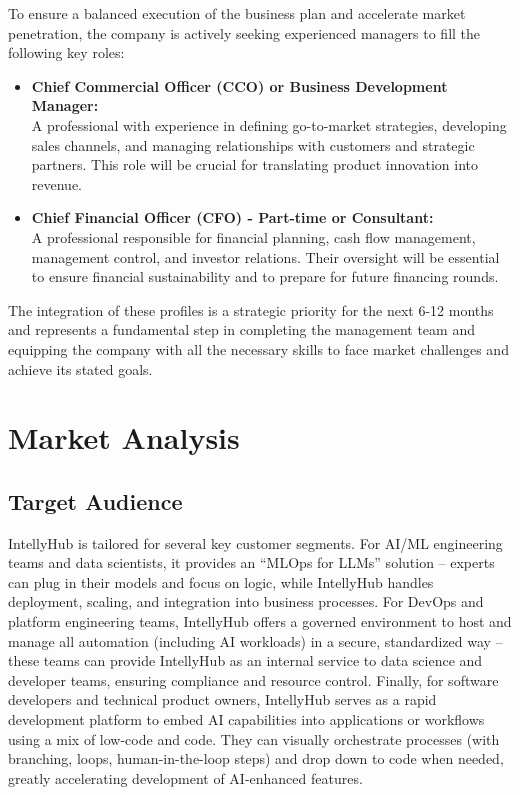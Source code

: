 To ensure a balanced execution of the business plan and accelerate market penetration, the company is actively seeking experienced managers to fill the following key roles:

\begin{itemize}
    \item \textbf{Chief Commercial Officer (CCO) or Business Development Manager:} \\
    A professional with experience in defining go-to-market strategies, developing sales channels, and managing relationships with customers and strategic partners. This role will be crucial for translating product innovation into revenue.

    \item \textbf{Chief Financial Officer (CFO) - Part-time or Consultant:} \\
    A professional responsible for financial planning, cash flow management, management control, and investor relations. Their oversight will be essential to ensure financial sustainability and to prepare for future financing rounds.
\end{itemize}

The integration of these profiles is a strategic priority for the next 6-12 months and represents a fundamental step in completing the management team and equipping the company with all the necessary skills to face market challenges and achieve its stated goals.


\section{Market Analysis}
\subsection{Target Audience}
IntellyHub is tailored for several key customer segments. For AI/ML engineering teams and data scientists, it provides an “MLOps for LLMs” solution – experts can plug in their models and focus on logic, while IntellyHub handles deployment, scaling, and integration into business processes. For DevOps and platform engineering teams, IntellyHub offers a governed environment to host and manage all automation (including AI workloads) in a secure, standardized way – these teams can provide IntellyHub as an internal service to data science and developer teams, ensuring compliance and resource control. Finally, for software developers and technical product owners, IntellyHub serves as a rapid development platform to embed AI capabilities into applications or workflows using a mix of low-code and code. They can visually orchestrate processes (with branching, loops, human-in-the-loop steps) and drop down to code when needed, greatly accelerating development of AI-enhanced features.


